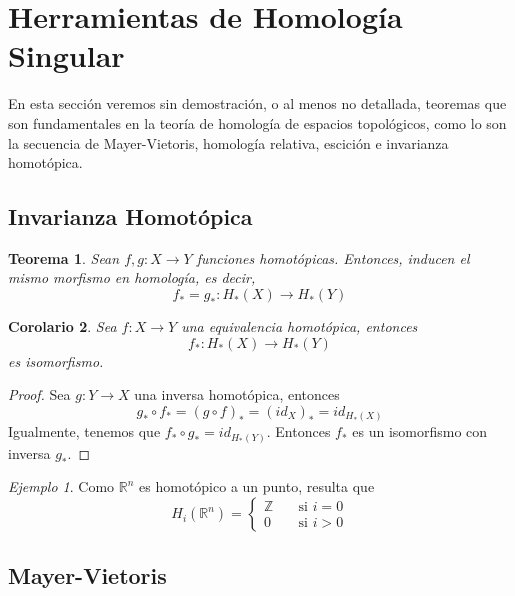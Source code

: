 \documentclass[aop]{imsart2}
\theoremstyle{plain}
\newtheorem{teo}{Teorema}[section]
\newtheorem{cor}[teo]{Corolario}
\theoremstyle{remark}
\newtheorem*{ej}{Ejemplo}
\def \R {\mathbb{R}}
\def \Z {\mathbb{Z}}
\begin{document}
\section{Herramientas de Homología Singular}
En esta sección veremos sin demostración, o al menos no detallada, teoremas que son fundamentales
en la teoría de homología de espacios topológicos, como lo son la secuencia de Mayer-Vietoris,
homología relativa, escición e invarianza homotópica.

\subsection{Invarianza Homotópica}

\begin{teo}
    Sean $f,g:X\to Y$ funciones homotópicas. Entonces, inducen el mismo morfismo en homología, 
    es decir,
    \begin{equation*}
        f_{*}=g_{*}:H_{*}(X)\to H_{*}(Y)
    \end{equation*}
\end{teo}

\begin{cor}
    Sea $f:X\to Y$ una equivalencia homotópica, entonces
    \begin{equation*}
        f_{*}:H_{*}(X)\to H_{*}(Y)
    \end{equation*}
    es isomorfismo.
\end{cor}
\begin{proof}
    Sea $g:Y\to X$ una inversa homotópica, entonces
    \begin{equation*}
        g_{*}\circ f_{*}=(g\circ f)_{*}=(id_{X})_{*}=id_{H_{*}(X)}
    \end{equation*}
    Igualmente, tenemos que $f_{*}\circ g_{*}=id_{H_{*}(Y)}$. Entonces $f_{*}$ es un isomorfismo
    con inversa $g_{*}$.
\end{proof}

\begin{ej}
Como $\R^{n}$ es homotópico a un punto, resulta que
    \begin{equation*}
        H_{i}(\R^{n})=\begin{cases}
            \Z &\quad\text{si }i=0 \\
            0 &\quad\text{si }i>0
        \end{cases}
    \end{equation*}
\end{ej}

\subsection{Mayer-Vietoris}
\end{document}
